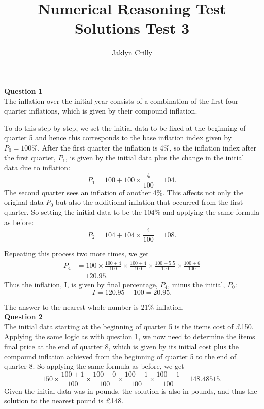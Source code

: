 \documentclass{article}
\title{Numerical Reasoning Test Solutions Test 3}
\author{Jaklyn Crilly}
\date{}
\begin{document}
\maketitle

\textbf{Question 1} \\
The inflation over the initial year consists of a combination of the first four quarter inflations, which is given by their compound inflation.

To do this step by step, we set the initial data to be fixed at the beginning of quarter 5 and hence this corresponds to the base inflation index given by $P_0 = 100\%$. After the first quarter the inflation is 4\%, so the inflation index after the first quarter, $P_1$, is given by the initial data plus the change in the initial data due to inflation:
$$P_1 = 100 + 100 \times \frac{4}{100} = 104.$$
The second quarter sees an inflation of another 4\%. This affects not only the original data $P_0$ but also the additional inflation that occurred from the first quarter. So setting the initial data to be the 104\% and applying the same formula as before:
$$P_2 = 104 + 104 \times \frac{4}{100}=108.$$

Repeating this process two more times, we get
\begin{equation*} 
\begin{split}
P_4 &= 100 \times \frac{100+4}{100} \times \frac{100+4}{100} \times \frac{100+5.5}{100} \times \frac{100+6}{100} \\
&= 120.95.
\end{split}
\end{equation*}
Thus the inflation, I, is given by final percentage, $P_4$, minus the initial, $P_0$:
$$ I= 120.95-100=20.95.$$

The answer to the nearest whole number is 21\% inflation.\\

\textbf{Question 2} \\
The initial data starting at the beginning of quarter 5 is the items cost of \pounds 150. Applying the same logic as with question 1, we now need to determine the items final price at the end of quarter 8, which is given by its initial cost plus the compound inflation achieved from the beginning of quarter 5 to the end of quarter 8. So applying the same formula as before, we get
$$150 \times \frac{100+1}{100} \times \frac{100+0}{100} \times \frac{100-1}{100} \times \frac{100-1}{100} = 148.48515.$$
Given the initial data was in pounds, the solution is also in pounds, and thus the solution to the nearest pound is \pounds 148. \\
\end{document}
